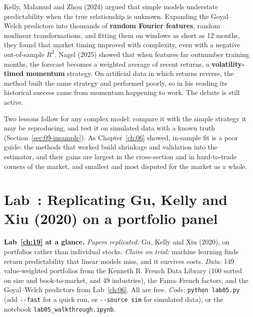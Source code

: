 Kelly, Malamud and Zhou (2024) argued that simple models understate predictability when the true relationship is unknown. Expanding the Goyal--Welch predictors into thousands of \textbf{random Fourier features}, random nonlinear transformations, and fitting them on windows as short as 12 months, they found that market timing improved with complexity, even with a negative out-of-sample $R^2$. Nagel (2025) showed that when features far outnumber training months, the forecast becomes a weighted average of recent returns, a \textbf{volatility-timed momentum} strategy. On artificial data in which returns reverse, the method built the same strategy and performed poorly, so in his reading its historical success came from momentum happening to work. The debate is still active.

Two lessons follow for any complex model: compare it with the simple strategy it may be reproducing, and test it on simulated data with a known truth (Section~\ref{sec:09-insample}). As Chapter~\ref{ch:06} showed, in-sample fit is a poor guide: the methods that worked build shrinkage and validation into the estimator, and their gains are largest in the cross-section and in hard-to-trade corners of the market, and smallest and most disputed for the market as a whole.

\section{Lab~\thechapter: Replicating Gu, Kelly and Xiu (2020) on a portfolio panel}
\label{sec:20-lab}

\begin{callout}
\textbf{Lab~\ref{ch:19} at a glance.} \emph{Papers replicated:} Gu, Kelly and Xiu (2020), on portfolios rather than individual stocks. \emph{Claim on trial:} machine learning finds return predictability that linear models miss, and it survives costs. \emph{Data:} 149 value-weighted portfolios from the Kenneth R. French Data Library (100 sorted on size and book-to-market, and 49 industries), the Fama--French factors, and the Goyal--Welch predictors from Lab~\ref{ch:06}. All are free. \emph{Code:} \texttt{python lab05.py} (add \texttt{-{}-fast} for a quick run, or \texttt{-{}-source sim} for simulated data), or the notebook \texttt{lab05\_walkthrough.ipynb}.
\end{callout}

